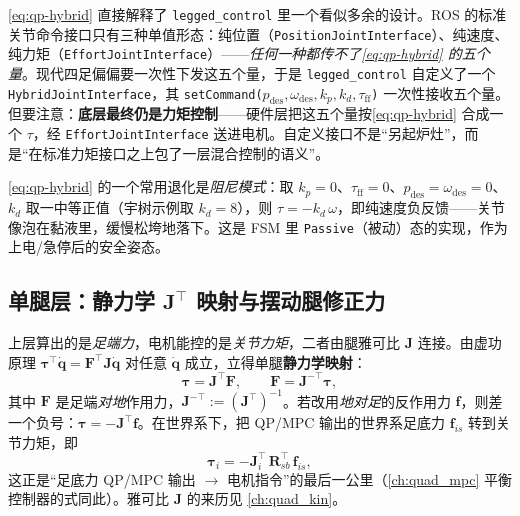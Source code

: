 \begin{insight}\label{ins:qp-hybrid-iface}
\cref{eq:qp-hybrid} 直接解释了 \texttt{legged\_control} 里一个看似多余的设计。ROS 的标准关节命令接口只有三种单值形态：纯位置（\texttt{PositionJointInterface}）、纯速度、纯力矩（\texttt{EffortJointInterface}）——\emph{任何一种都传不了\cref{eq:qp-hybrid} 的五个量}。现代四足偏偏要一次性下发这五个量，于是 \texttt{legged\_control} 自定义了一个 \texttt{HybridJointInterface}，其 \texttt{setCommand($p_{\mathrm{des}},\omega_{\mathrm{des}},k_p,k_d,\tau_{\mathrm{ff}}$)} 一次性接收五个量。但要注意：\textbf{底层最终仍是力矩控制}——硬件层把这五个量按\cref{eq:qp-hybrid} 合成一个 $\tau$，经 \texttt{EffortJointInterface} 送进电机。自定义接口不是“另起炉灶”，而是“在标准力矩接口之上包了一层混合控制的语义”。
\end{insight}

\begin{note}\label{note:qp-damping}
\cref{eq:qp-hybrid} 的一个常用退化是\emph{阻尼模式}：取 $k_p{=}0$、$\tau_{\mathrm{ff}}{=}0$、$p_{\mathrm{des}}{=}\omega_{\mathrm{des}}{=}0$、$k_d$ 取一中等正值（宇树示例取 $k_d{=}8$），则 $\tau=-k_d\,\omega$，即纯速度负反馈——关节像泡在黏液里，缓慢松垮地落下\cite{unitree2023quadruped}。这是 FSM 里 \texttt{Passive}（被动）态的实现，作为上电/急停后的安全姿态。
\end{note}

\subsection{单腿层：静力学 $\mathbf{J}^\top$ 映射与摆动腿修正力}
\label{subsec:qp-leg}

上层算出的是\emph{足端力}，电机能控的是\emph{关节力矩}，二者由腿雅可比 $\mathbf{J}$ 连接。由虚功原理 $\boldsymbol{\tau}^\top\dot{\boldsymbol{q}}=\boldsymbol{F}^\top\mathbf{J}\dot{\boldsymbol{q}}$ 对任意 $\dot{\boldsymbol{q}}$ 成立，立得单腿\textbf{静力学映射}\cite{unitree2023quadruped}：
\begin{equation}
  \boldsymbol{\tau}=\mathbf{J}^\top\boldsymbol{F},
  \qquad
  \boldsymbol{F}=\mathbf{J}^{-\top}\boldsymbol{\tau},
  \label{eq:qp-jacobian-force}
\end{equation}
其中 $\boldsymbol{F}$ 是足端\emph{对地}作用力，$\mathbf{J}^{-\top}:=(\mathbf{J}^\top)^{-1}$。若改用\emph{地对足}的反作用力 $\boldsymbol{f}$，则差一个负号：$\boldsymbol{\tau}=-\mathbf{J}^\top\boldsymbol{f}$。在世界系下，把 QP/MPC 输出的世界系足底力 $\boldsymbol{f}_{is}$ 转到关节力矩，即\cite{unitree2023quadruped}
\begin{equation}
  \boldsymbol{\tau}_i=-\mathbf{J}_i^\top\,\mathbf{R}_{sb}^\top\,\boldsymbol{f}_{is},
  \label{eq:qp-grf-to-torque}
\end{equation}
这正是“足底力 QP/MPC 输出 $\to$ 电机指令”的最后一公里（\cref{ch:quad_mpc} 平衡控制器的式同此）。雅可比 $\mathbf{J}$ 的来历见 \cref{ch:quad_kin}。

